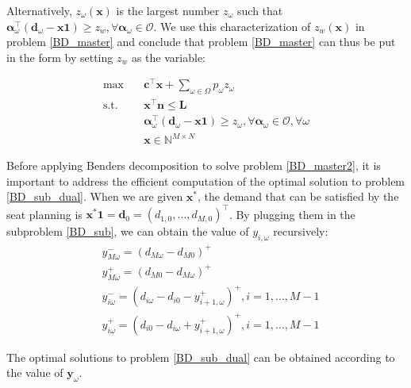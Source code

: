 Alternatively, $z_{\omega}(\mathbf{x})$ is the largest number $z_{\omega}$ such that $\bm{\alpha}_{\omega}^{\intercal}(\mathbf{d}_{\omega}- \mathbf{x} \mathbf{1}) \geq z_w, \forall \bm{\alpha}_{\omega} \in \mathcal{O}$. We use this characterization of $z_w(\mathbf{x})$ in problem \eqref{BD_master} and conclude that problem \eqref{BD_master} can thus be put in the form by setting $z_w$ as the variable:

\begin{equation}\label{BD_master2}
  \begin{aligned}
    \max \quad & \mathbf{c}^{\intercal} \mathbf{x} + \sum_{\omega \in \Omega} p_{\omega} z_{\omega} \\
    \text {s.t.} \quad & \mathbf{x}^{\intercal} \mathbf{n}  \leq \mathbf{L} \\
    & \bm{\alpha}_{\omega}^{\intercal}(\mathbf{d}_{\omega}- \mathbf{x} \mathbf{1}) \geq z_{\omega}, \forall \bm{\alpha}_{\omega} \in \mathcal{O}, \forall \omega \\
     & \mathbf{x} \in \mathbb{N}^{M \times N}
  \end{aligned}
\end{equation}


Before applying Benders decomposition to solve problem \eqref{BD_master2}, it is important to address the efficient computation of the optimal solution to problem \eqref{BD_sub_dual}.
When we are given $\mathbf{x}^{*}$, the demand that can be satisfied by the seat planning is $\mathbf{x}^{*} \mathbf{1} = \mathbf{d}_0 = (d_{1,0},\ldots,d_{M,0})^{\intercal}$.
By plugging them in the subproblem \eqref{BD_sub}, we can obtain the value of $y_{i, \omega}$ recursively:
\begin{equation}\label{y_recursively}
\begin{aligned}
  & y_{M \omega}^{-}=\left(d_{M \omega}-d_{M 0}\right)^{+} \\
  & y_{M \omega}^{+}=\left(d_{M 0}-d_{M \omega}\right)^{+} \\
  & y_{i \omega}^{-}=\left(d_{i \omega}-d_{i 0} - y_{i+1, \omega}^{+} \right)^{+}, i =1,\ldots, M-1 \\
  & y_{i \omega}^{+}=\left(d_{i 0}- d_{i \omega} + y_{i+1, \omega}^{+}\right)^{+}, i =1,\ldots, M-1
\end{aligned}
\end{equation}

The optimal solutions to problem \eqref{BD_sub_dual} can be obtained according to the value of $\mathbf{y}_{\omega}$.

